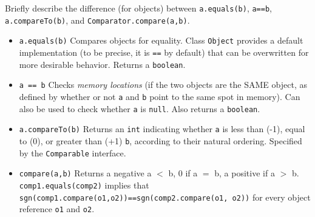 Briefly describe the difference (for objects) between \texttt{a.equals(b)}, \texttt{a==b}, \texttt{a.compareTo(b)}, and \texttt{Comparator.compare(a,b)}.

\begin{answer}
\begin{itemize}

\item \texttt{a.equals(b)} Compares objects for equality. Class \texttt{Object} provides a default implementation (to be precise, it is \texttt{==} by default) that can be overwritten for more desirable behavior. Returns a \texttt{boolean}.

\item \texttt{a == b}  Checks \textit{memory locations} (if the two objects are the SAME object, as defined by whether or not \texttt{a} and \texttt{b} point to the same spot in memory). Can also be used to check whether \texttt{a} is \texttt{null}. Also returns a \texttt{boolean}.

\item \texttt{a.compareTo(b)} Returns an \texttt{int} indicating whether \texttt{a} is less than (-1),
equal to (0), or greater than (+1) \texttt{b}, according to their natural ordering. Specified by the \texttt{Comparable} interface.

\item \texttt{compare(a,b)} Returns a negative a $<$ b, 0 if a $=$ b, a positive if a $>$ b. \\
\texttt{comp1.equals(comp2)} implies that \\ \texttt{sgn(comp1.compare(o1,o2))==sgn(comp2.compare(o1, o2))} for every object reference \texttt{o1} and \texttt{o2}.

\end{itemize}
\end{answer}
